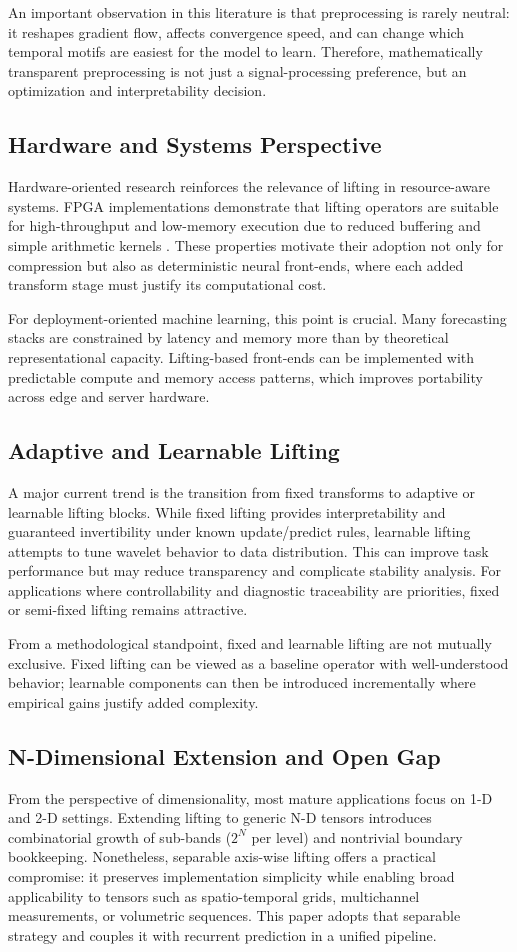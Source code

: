 \documentclass[journal]{IEEEtran}
\begin{document}
An important observation in this literature is that preprocessing is rarely neutral: it reshapes gradient flow, affects convergence speed, and can change which temporal motifs are easiest for the model to learn. Therefore, mathematically transparent preprocessing is not just a signal-processing preference, but an optimization and interpretability decision.

\subsection{Hardware and Systems Perspective}
Hardware-oriented research reinforces the relevance of lifting in resource-aware systems. FPGA implementations demonstrate that lifting operators are suitable for high-throughput and low-memory execution due to reduced buffering and simple arithmetic kernels \cite{taha2020fpga}. These properties motivate their adoption not only for compression but also as deterministic neural front-ends, where each added transform stage must justify its computational cost.

For deployment-oriented machine learning, this point is crucial. Many forecasting stacks are constrained by latency and memory more than by theoretical representational capacity. Lifting-based front-ends can be implemented with predictable compute and memory access patterns, which improves portability across edge and server hardware.

\subsection{Adaptive and Learnable Lifting}
A major current trend is the transition from fixed transforms to adaptive or learnable lifting blocks. While fixed lifting provides interpretability and guaranteed invertibility under known update/predict rules, learnable lifting attempts to tune wavelet behavior to data distribution. This can improve task performance but may reduce transparency and complicate stability analysis. For applications where controllability and diagnostic traceability are priorities, fixed or semi-fixed lifting remains attractive.

From a methodological standpoint, fixed and learnable lifting are not mutually exclusive. Fixed lifting can be viewed as a baseline operator with well-understood behavior; learnable components can then be introduced incrementally where empirical gains justify added complexity.

\subsection{N-Dimensional Extension and Open Gap}
From the perspective of dimensionality, most mature applications focus on 1-D and 2-D settings. Extending lifting to generic N-D tensors introduces combinatorial growth of sub-bands ($2^N$ per level) and nontrivial boundary bookkeeping. Nonetheless, separable axis-wise lifting offers a practical compromise: it preserves implementation simplicity while enabling broad applicability to tensors such as spatio-temporal grids, multichannel measurements, or volumetric sequences. This paper adopts that separable strategy and couples it with recurrent prediction in a unified pipeline.
\end{document}
